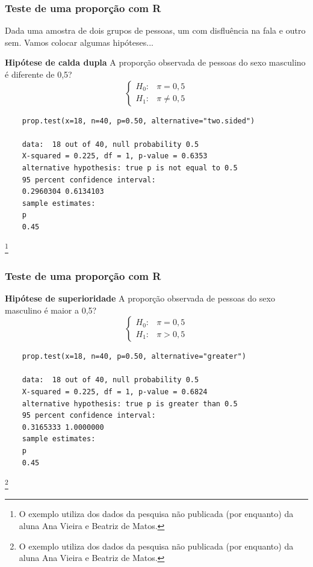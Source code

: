 \documentclass[graphics,14pt]{beamer}
\newcommand{\lfr}[1]{\let\thefootnote\relax\footnote{\hspace{0.6cm}\vspace{1.25cm} #1}}
\begin{document}
\begin{frame}[t,fragile=singleslide]
\frametitle{Teste de uma proporção com R}
	Dada uma amostra de dois grupos de pessoas, um com disfluência na fala e outro sem. Vamos colocar algumas hipóteses...
	
	\textbf{Hipótese de calda dupla}
	A proporção observada de pessoas do sexo masculino é diferente de 0,5?
	\begin{equation*}
	\left\{ \begin{array}{cl}
	H_0: & \pi = 0,5 \\
	H_1: & \pi \neq 0,5
	\end{array}\right.
	\end{equation*}
	
	\begin{lstlisting}
	prop.test(x=18, n=40, p=0.50, alternative="two.sided")
	
	data:  18 out of 40, null probability 0.5
	X-squared = 0.225, df = 1, p-value = 0.6353
	alternative hypothesis: true p is not equal to 0.5
	95 percent confidence interval:
	0.2960304 0.6134103
	sample estimates:
	p 
	0.45
	\end{lstlisting}
	
	\lfr{O exemplo utiliza dos dados da pesquisa não publicada (por enquanto) da aluna Ana Vieira e Beatriz de Matos.}
\end{frame}
\begin{frame}[t,fragile=singleslide]
\frametitle{Teste de uma proporção com R}
	\textbf{Hipótese de superioridade}
	A proporção observada de pessoas do sexo masculino é maior a 0,5?
	\begin{equation*}
	\left\{ \begin{array}{cl}
	H_0: & \pi = 0,5 \\
	H_1: & \pi > 0,5
	\end{array}\right.
	\end{equation*}
	
	\begin{lstlisting}
	prop.test(x=18, n=40, p=0.50, alternative="greater")
	
	data:  18 out of 40, null probability 0.5
	X-squared = 0.225, df = 1, p-value = 0.6824
	alternative hypothesis: true p is greater than 0.5
	95 percent confidence interval:
	0.3165333 1.0000000
	sample estimates:
	p 
	0.45 
	\end{lstlisting}

\lfr{O exemplo utiliza dos dados da pesquisa não publicada (por enquanto) da aluna Ana Vieira e Beatriz de Matos.}
\end{frame}
\end{document}
